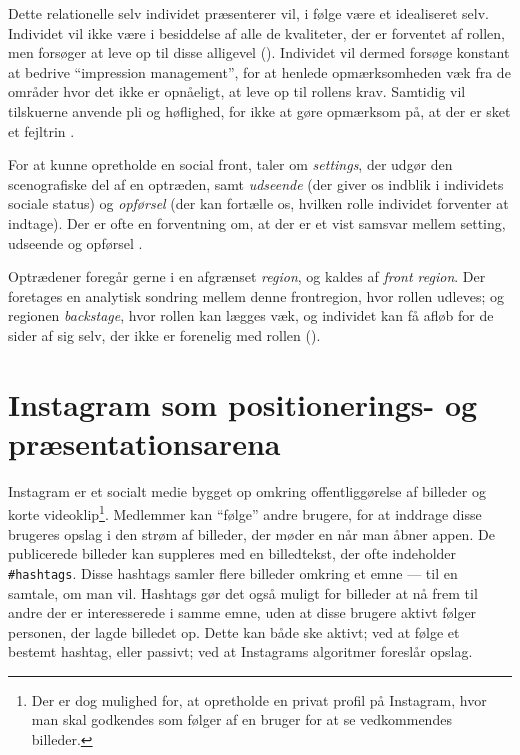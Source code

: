 Dette relationelle selv individet præsenterer vil, i følge 
\citeauthor{goffmanPresentationSelfEveryday1956} være et 
idealiseret selv. Individet vil ikke være i besiddelse af alle de 
kvaliteter, der er forventet af rollen, men forsøger at leve op 
til disse alligevel (\citeyear[s.  
?]{goffmanPresentationSelfEveryday1956}). Individet vil dermed 
forsøge konstant at bedrive “impression management”, for at 
henlede opmærksomheden væk fra de områder hvor det ikke er 
opnåeligt, at leve op til rollens krav. Samtidig vil tilskuerne 
anvende pli og høflighed, for ikke at gøre opmærksom på, at der er 
sket et fejltrin \autocite[s.  
7-8]{goffmanPresentationSelfEveryday1956}.

For at kunne opretholde en social front, taler 
\citeauthor{goffmanPresentationSelfEveryday1956} om 
\emph{settings}, der udgør den scenografiske del af en optræden, 
samt \emph{udseende} (der giver os indblik i individets sociale 
status) og \emph{opførsel} (der kan fortælle os, hvilken rolle 
individet forventer at indtage).  Der er ofte en forventning om, 
at der er et vist samsvar mellem setting, udseende og opførsel 
\autocite[s. 14-15]{goffmanPresentationSelfEveryday1956}.

Optrædener foregår gerne i en afgrænset \emph{region}, og kaldes 
af \citeauthor{goffmanPresentationSelfEveryday1956} \emph{front
region}. Der foretages en analytisk sondring mellem  denne
frontregion, hvor rollen udleves; og regionen  \emph{backstage},
hvor rollen kan lægges væk, og individet kan få  afløb for de
sider af sig selv, der ikke er forenelig med rollen  (\citeyear[s.
69]{goffmanPresentationSelfEveryday1956}).

\section{Instagram som positionerings- og præsentationsarena}

Instagram er et socialt medie bygget op omkring offentliggørelse 
af billeder og korte videoklip\footnote{Der er dog mulighed for,
at opretholde en privat profil på Instagram, hvor man skal 
godkendes som følger af en bruger for at se vedkommendes 
billeder.}. Medlemmer kan “følge” andre brugere, for at inddrage 
disse brugeres opslag i den strøm af billeder, der møder en når 
man åbner appen. De publicerede billeder kan suppleres med en
billedtekst, der ofte indeholder 
\texttt{\#hashtags}.  Disse hashtags samler flere billeder omkring
et emne — til en samtale, om man vil. Hashtags gør det også muligt
for billeder at nå frem til andre der er interesserede i samme 
emne, uden at disse brugere aktivt følger personen, der lagde 
billedet op. Dette kan både ske aktivt; ved at følge et bestemt
hashtag, eller passivt; ved at Instagrams algoritmer foreslår
opslag.

